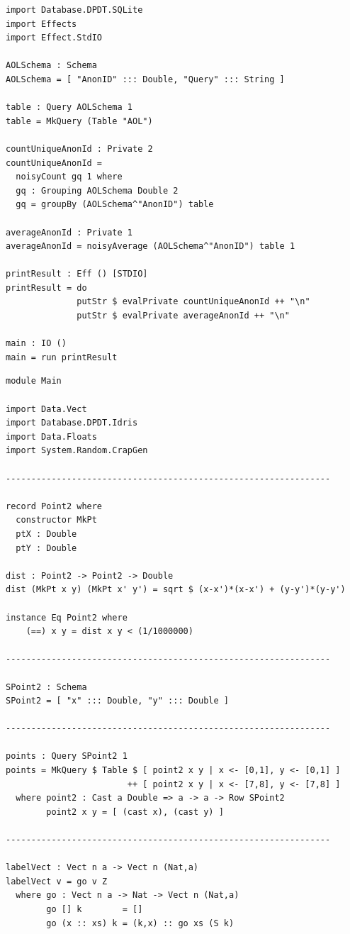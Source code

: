 \documentclass[12pt]{report}
\begin{document}
\begin{appendices}
\begin{lstlisting}[caption={tests/SQLite/AOLData.idr},label={appx:aoldata_sqlite}]
import Database.DPDT.SQLite
import Effects
import Effect.StdIO

AOLSchema : Schema
AOLSchema = [ "AnonID" ::: Double, "Query" ::: String ]

table : Query AOLSchema 1
table = MkQuery (Table "AOL")

countUniqueAnonId : Private 2
countUniqueAnonId =
  noisyCount gq 1 where
  gq : Grouping AOLSchema Double 2
  gq = groupBy (AOLSchema^"AnonID") table

averageAnonId : Private 1
averageAnonId = noisyAverage (AOLSchema^"AnonID") table 1

printResult : Eff () [STDIO]
printResult = do
              putStr $ evalPrivate countUniqueAnonId ++ "\n"
              putStr $ evalPrivate averageAnonId ++ "\n"

main : IO ()
main = run printResult
\end{lstlisting}

\begin{lstlisting}[caption={tests/idris/kMeans3.idr},label={appx:kMeans3}]
module Main

import Data.Vect
import Database.DPDT.Idris
import Data.Floats
import System.Random.CrapGen

----------------------------------------------------------------

record Point2 where
  constructor MkPt
  ptX : Double
  ptY : Double

dist : Point2 -> Point2 -> Double
dist (MkPt x y) (MkPt x' y') = sqrt $ (x-x')*(x-x') + (y-y')*(y-y')

instance Eq Point2 where
    (==) x y = dist x y < (1/1000000)

----------------------------------------------------------------

SPoint2 : Schema
SPoint2 = [ "x" ::: Double, "y" ::: Double ]

----------------------------------------------------------------

points : Query SPoint2 1
points = MkQuery $ Table $ [ point2 x y | x <- [0,1], y <- [0,1] ]
                        ++ [ point2 x y | x <- [7,8], y <- [7,8] ]
  where point2 : Cast a Double => a -> a -> Row SPoint2
        point2 x y = [ (cast x), (cast y) ]

----------------------------------------------------------------

labelVect : Vect n a -> Vect n (Nat,a)
labelVect v = go v Z
  where go : Vect n a -> Nat -> Vect n (Nat,a)
        go [] k        = []
        go (x :: xs) k = (k,x) :: go xs (S k)


\end{lstlisting}
\end{appendices}
\end{document}
